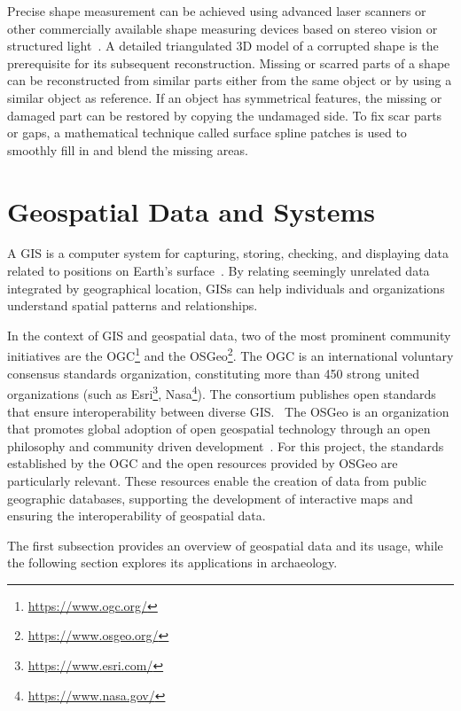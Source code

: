 Precise shape measurement can be achieved using advanced laser scanners or other commercially available shape measuring devices based on stereo 
vision or structured light~\cite{7801178}. A detailed triangulated \gls{3D} model of a corrupted shape is the prerequisite for its subsequent reconstruction. 
Missing or scarred parts of a shape can be reconstructed from similar parts either from the same
object or by using a similar object as reference. If an object has symmetrical features, the missing or damaged part can be restored by copying the undamaged side.
To fix scar parts or gaps, a mathematical technique called surface spline patches is used to smoothly fill in and blend the missing areas.

\section{Geospatial Data and Systems}
\label{sec:geographic_information_system}

A \acrfull{GIS} is a computer system for capturing, storing, checking, and displaying data related to positions on Earth’s 
surface~\cite{natgeo_2024}. By relating seemingly unrelated data integrated by geographical location, \glspl{GIS} can help individuals and organizations understand spatial patterns and relationships.

In the context of \gls{GIS} and geospatial data, two of the most prominent community initiatives are the \gls{OGC}\footnote{\url{https://www.ogc.org/}} and the \gls{OSGeo}\footnote{\url{https://www.osgeo.org/}}.  
The \gls{OGC} is an international voluntary consensus standards organization, constituting more than 450 strong united organizations (such as Esri\footnote{\url{https://www.esri.com/}}, Nasa\footnote{\url{https://www.nasa.gov/}}). The consortium publishes open standards that ensure interoperability between diverse \gls{GIS}.~\cite{ogc_who_we_are, ogcapi}
The \gls{OSGeo} is an organization that promotes global adoption of open geospatial technology through an open philosophy and community driven development~\cite{osgeo_about}. 
For this project, the standards established by the \gls{OGC} and the open resources provided by \gls{OSGeo} are particularly relevant. 
These resources enable the creation of data from public geographic databases, supporting the development of interactive maps and ensuring the interoperability of geospatial data.

The first subsection provides an overview of geospatial data and its usage, while the following section explores its applications in archaeology.

